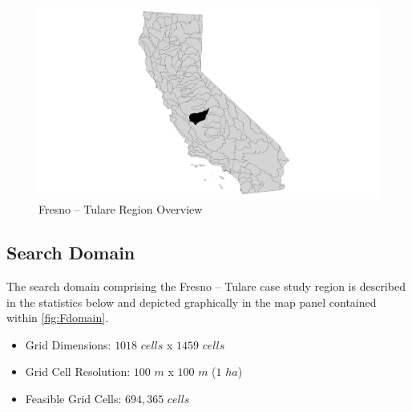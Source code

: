         \begin{figure}[!h]
            \begin{center}
            \includegraphics[width=5.5in]{figures/Fresno_Overview.png}   
            \caption{Fresno -- Tulare Region Overview}
            \label{fig:Foverview}
            \end{center}
        \end{figure}

    \subsection{Search Domain}

 The search domain comprising the Fresno -- Tulare case study region is described in the statistics below and depicted graphically in the map panel contained within \ref{fig:Fdomain}.
    
    \begin{itemize}
      \setlength{\itemsep}{0cm}
      \setlength{\parskip}{0cm}
        \item Grid Dimensions: $1018$ $cells$ x $1459$ $cells$
        \item Grid Cell Resolution: $100$ $m$ x $100$ $m$ ($1$ $ha$)
        \item Feasible Grid Cells: $694,365$ $cells$
    \end{itemize}
    
